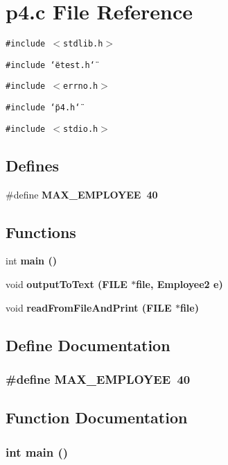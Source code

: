 \section{p4.c File Reference}
\label{p4_8c}
{\tt \#include $<$stdlib.h$>$}\par
{\tt \#include \char`\"{}etest.h\char`\"{}}\par
{\tt \#include $<$errno.h$>$}\par
{\tt \#include \char`\"{}p4.h\char`\"{}}\par
{\tt \#include $<$stdio.h$>$}\par
\subsection*{Defines}
\begin{CompactItemize}
\item 
\#define \bf{MAX\_\-EMPLOYEE}~40
\end{CompactItemize}
\subsection*{Functions}
\begin{CompactItemize}
\item 
int \bf{main} ()
\item 
void \bf{output\-To\-Text} (FILE $\ast$file, \bf{Employee2} e)
\item 
void \bf{read\-From\-File\-And\-Print} (FILE $\ast$file)
\end{CompactItemize}


\subsection{Define Documentation}
\subsubsection{\setlength{\rightskip}{0pt plus 5cm}\#define MAX\_\-EMPLOYEE~40}\label{p4_8c_ee0ebd40b7f91bd31a2fbe80930a8d51}




\subsection{Function Documentation}
\subsubsection{\setlength{\rightskip}{0pt plus 5cm}int main ()}\label{p4_8c_e66f6b31b5ad750f1fe042a706a4e3d4}


